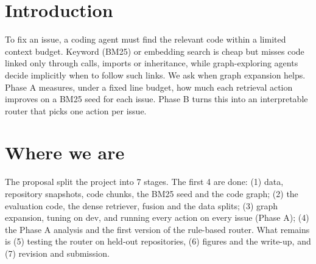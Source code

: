 \documentclass[10pt,a4paper,twocolumn]{article}
\begin{document}

\section{Introduction}
To fix an issue, a coding agent must find the relevant code
within a limited context budget. Keyword (BM25) or embedding search is cheap but misses code linked only through calls,
imports or inheritance, while graph-exploring agents decide
implicitly when to follow such links. We ask when graph
expansion helps. Phase A measures, under a fixed line budget,
how much each retrieval action improves on a BM25 seed for
each issue. Phase B turns this into an interpretable router that
picks one action per issue.

\section{Where we are}
The proposal split the project into 7 stages. The first 4 are done:
(1) data, repository snapshots, code chunks, the BM25 seed and the code
graph;
(2) the evaluation code, the dense retriever, fusion and the data splits;
(3) graph expansion, tuning on dev, and running every action on every issue
(Phase A);
(4) the Phase A analysis and the first version of the rule-based router.
What remains is (5) testing the router on held-out repositories,
(6) figures and the write-up, and (7) revision and submission.
\end{document}
